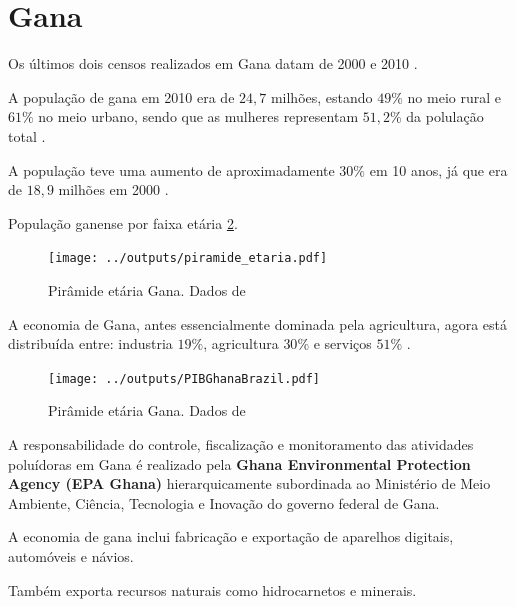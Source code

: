 \section{Gana}

Os últimos dois censos realizados em Gana datam
de 2000 \cite{censu2003} e 2010 \cite{censu2013}.

A população de gana em 2010 era de $24,7$ milhões, 
estando $49\%$ no meio rural e $61\%$ no meio urbano, 
sendo que as mulheres representam $51,2\%$ da polulação
total \cite{censu2013}.  

A população teve uma aumento de aproximadamente 
$30\%$ em 10 anos, já que era de $18,9$ milhões 
em 2000 \cite{censu2003}.

População ganense por faixa etária \ref{fig:piramedegana}. 

\begin{figure}[H]
\begin{center}
  \texttt{[image: ../outputs/piramide\_etaria.pdf]}
  \caption{Pirâmide etária Gana. Dados de \cite{censu2013} \label{fig:piramedegana}}
\end{center}
\end{figure}

A economia de Gana, antes essencialmente dominada pela agricultura, 
agora está distribuída entre: industria $19\%$, agricultura $30\%$ 
e serviços $51\%$ \cite{censu2013}. 

\begin{figure}[H]
\begin{center}
  \texttt{[image: ../outputs/PIBGhanaBrazil.pdf]}
  \caption{Pirâmide etária Gana. Dados de \cite{censu2013} \label{fig:piramedegana}}
\end{center}
\end{figure}

A responsabilidade do controle, fiscalização e monitoramento das 
atividades poluídoras em Gana é realizado pela 
\textbf{Ghana Environmental Protection Agency (EPA Ghana)} hierarquicamente
subordinada ao Ministério de Meio Ambiente, Ciência, Tecnologia e Inovação do 
governo federal de Gana.

A economia de gana inclui fabricação e exportação de aparelhos digitais, 
automóveis e návios. 

Também exporta recursos naturais como hidrocarnetos e minerais.

